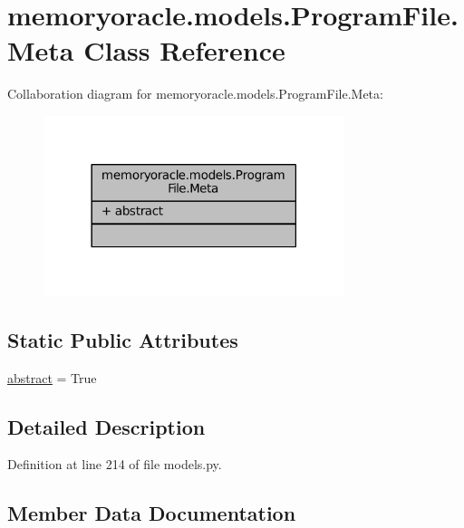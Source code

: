 \hypertarget{classmemoryoracle_1_1models_1_1ProgramFile_1_1Meta}{}\section{memoryoracle.\+models.\+Program\+File.\+Meta Class Reference}
\label{classmemoryoracle_1_1models_1_1ProgramFile_1_1Meta}


Collaboration diagram for memoryoracle.\+models.\+Program\+File.\+Meta\+:\nopagebreak
\begin{figure}[H]
\begin{center}
\leavevmode
\includegraphics[width=249pt]{classmemoryoracle_1_1models_1_1ProgramFile_1_1Meta__coll__graph}
\end{center}
\end{figure}
\subsection*{Static Public Attributes}
\begin{DoxyCompactItemize}
\item 
\hyperlink{classmemoryoracle_1_1models_1_1ProgramFile_1_1Meta_a1f3d5255f5c71b2f180406bb92b2183f}{abstract} = True
\end{DoxyCompactItemize}


\subsection{Detailed Description}


Definition at line 214 of file models.\+py.



\subsection{Member Data Documentation}
\hypertarget{classmemoryoracle_1_1models_1_1ProgramFile_1_1Meta_a1f3d5255f5c71b2f180406bb92b2183f}{}
